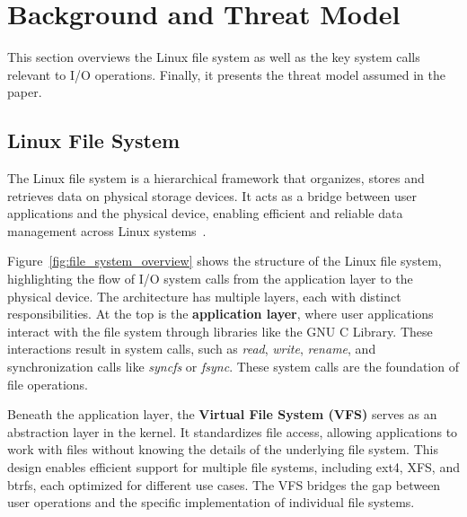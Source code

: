 \section{Background and Threat Model}
\label{sec:background}

This section overviews the Linux file system as well as the key system calls relevant to I/O operations. Finally, it presents the threat model assumed in the paper.




\subsection{Linux File System}


The Linux file system is a hierarchical framework that organizes, stores and retrieves data on physical storage devices. It acts as a bridge between user applications and the physical device, enabling efficient and reliable data management across Linux systems~\cite{arpaci2018operating}. 

Figure~\ref{fig:file_system_overview} shows the structure of the Linux file system, highlighting the flow of I/O system calls from the application layer to the physical device.  The architecture has multiple layers, each with distinct responsibilities. At the top is the \textbf{application layer}, where user applications interact with the file system through libraries like the GNU C Library. These interactions result in system calls, such as \textit{read}, \textit{write}, \textit{rename}, and synchronization calls like \textit{syncfs} or \textit{fsync}. These system calls are the foundation of file operations.

Beneath the application layer, the \textbf{Virtual File System (VFS)} serves as an abstraction layer in the kernel. It standardizes file access, allowing applications to work with files without knowing the details of the underlying file system. This design enables efficient support for multiple file systems, including ext4, XFS, and btrfs, each optimized for different use cases. The VFS bridges the gap between user operations and the specific implementation of individual file systems.

